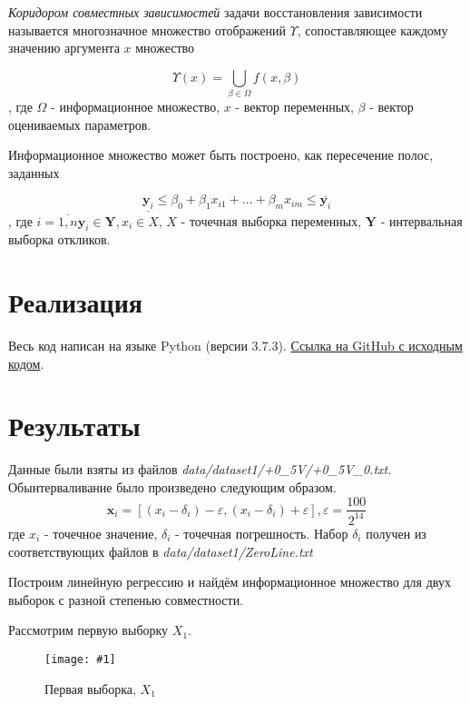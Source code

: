 \documentclass[a4paper,12pt]{article}
\newcommand{\plot}[3]{
    \begin{figure}[H]
        \begin{center}
            \texttt{[image: \#1]}
            \caption{#2}
            \label{#3}
        \end{center}
    \end{figure}
}
\begin{document}
    \textsl{Коридором совместных зависимостей} задачи восстановления зависимости
    называется многозначное множество отображений $ \Upsilon $, сопоставляющее
    каждому значению аргумента $ x $ множество
    
    \begin{equation}
        \Upsilon(x) = \bigcup_{\beta \in \Omega} f(x, \beta)
    \end{equation}
    , где $ \Omega $ - информационное множество, $ x $ - вектор переменных, $ \beta $ - вектор оцениваемых параметров. 

    Информационное множество может быть построено, как пересечение полос, заданных
    
    \begin{equation}
        \underline{\textbf{y}_i} \leq \beta_0 + \beta_1 x_{i1} + ... + \beta_m x_{im} \leq \overline{\textbf{y}_i}
    \end{equation}
    , где $ i = \overline{1, n} \textbf{y}_i \in \textbf{Y}, x_i \in X $, $ X $ - точечная выборка переменных,
    $ \textbf{Y} $ - интервальная выборка откликов.

    \section{Реализация}
    \quad Весь код написан на языке Python (версии 3.7.3).
    \href{https://github.com/kirillkuks/Intervals/tree/master/lab2}{Ссылка на GitHub с исходным кодом}.

    \section{Результаты}
    \quad Данные были взяты из файлов \textsl{data/dataset1/+0\_5V/+0\_5V\_0.txt}.
    Обынтерваливание было произведено следующим образом.
    \begin{equation}
        \textbf{x}_i = [(x_i - \delta_i) - \varepsilon, (x_i - \delta_i) + \varepsilon], \varepsilon = \frac{100}{2^{14}}
    \end{equation}
    где $ x_i $ - точечное значение, $ \delta_i $ - точечная погрешность.
    Набор $ \delta_i $ получен из соответствующих файлов в \textsl{data/dataset1/ZeroLine.txt}

    Построим линейную регрессию и найдём информационное множество для двух выборок
    с разной степенью совместности.

    Рассмотрим первую выборку $ X_1 $.
    \plot{X1}{Первая выборка, $ X_1 $}{p:sampleX1}
\end{document}
